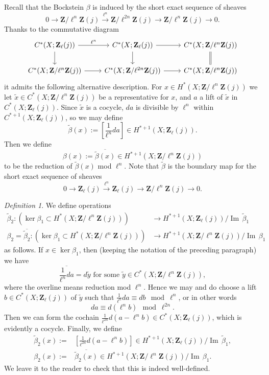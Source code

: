 \documentclass[10pt, reqno]{amsart}
\numberwithin{equation}{subsection}
\newcommand{\wt}[1]{\widetilde{#1}}
\newcommand{\Z}{\mathbf{Z}}
\newcommand{\ol}[1]{\overline{#1}}
\newcommand{\co}{\colon}
\DeclareMathOperator{\et}{\acute{e}t}
\DeclareMathOperator{\Ima}{Im\,}
\theoremstyle{remark}
\newtheorem{defn}[thm]{Definition}
\begin{document}
Recall that the Bockstein $\beta$ is induced by the short exact sequence of sheaves
\[
0 \rightarrow \Z/\ell^n \Z (j) \xrightarrow{\ell^n}	 \Z/\ell^{2n} \Z(j)  \rightarrow \Z/\ell^n \Z(j) \rightarrow 0.
\]
Thanks to the commutative diagram 
\[
\begin{tikzcd}
C^*(X; \Z_\ell(j)) \ar[d] \ar[r, "\ell^n"] & C^*(X; \Z_\ell(j)) \ar[r] \ar[d] & C^*(X; \Z/\ell^n\Z(j)) \ar[d, equals] \\
C^*(X; \Z/\ell^n\Z(j)) \ar[r] &  C^*(X; \Z/\ell^{2n}\Z(j)) \ar[r] &  C^*(X; \Z/\ell^n\Z(j))
\end{tikzcd}
\] 
it admits the following alternative description. For $x \in H^*_{\et}(X; \Z/\ell^n\Z(j))$ we let $\wt{x} \in C^*_{\et}(X; \Z/\ell^n \Z(j))$ be a representative for $x$, and $a$ a lift of $\wt{x}$ in $C^*_{\et}(X; \Z_{\ell}(j))$. Since $\wt{x}$ is a cocycle, $da$ is divisible by $\ell^n$ within $C^{*+1}_{\et}(X; \Z_{\ell}(j))$, so we may define 
\[
\wt{\beta}(x) := \left[\frac{1}{\ell^n}da \right]\in  H^{*+1}_{\et}(X; \Z_{\ell}(j)).
\]
Then we define 
\[
\beta(x) := \ol{\wt{\beta}(x) }\in H^{*+1}_{\et}(X; \Z/{\ell}^n \Z(j))
\]
to be the reduction of $\wt{\beta}(x)$ mod $\ell^n$. Note that $\wt{\beta}$ is the boundary map for the short exact sequence of sheaves
\[
0 \rightarrow \Z_\ell(j) \xrightarrow{\ell^n}	 \Z_{\ell}(j)  \rightarrow \Z/\ell^n \Z(j) \rightarrow 0.
\]

\begin{defn}\label{defn: beta_2}
We define operations
\begin{align*}
\wt{\beta}_2 \co (\ker \beta_1 \subset H^{*}_{\et}(X; \Z/\ell^n \Z(j)) ) & \rightarrow H^{*+1}_{\et}(X; \Z_{\ell}(j)) / \Ima \wt{\beta}_1 \\
\beta_2  = \ol{\wt{\beta}_2} \co (\ker \beta_1 \subset H^{*}_{\et}(X; \Z/\ell^n \Z(j)) ) &\rightarrow H^{*+1}_{\et}(X; \Z/\ell^n\Z(j)) / \Ima \beta_1
\end{align*}
as follows. If $x \in \ker \beta_1$, then (keeping the notation of the preceding paragraph) we have 
\[
\ol{\frac{1}{\ell^n}da} = d \wt{y} \text{  for some  } \wt{y} \in C^{*}_{\et}(X; \Z/\ell^n \Z(j)),
\]
where the overline means reduction mod $\ell^n$. Hence we may and do choose a lift $b \in C^{*}_{\et}(X; \Z_{\ell} (j)) $ of $\wt{y}$ such that $\frac{1}{\ell^n} d a \equiv d b\mod{\ell^n}$, or in other words 
\[
d a \equiv d (\ell^n b) \mod{\ell^{2n}}.
\]
Then we can form the cochain $\frac{1}{\ell^{2n}} d (a-\ell^n b) \in C^{*}_{\et}(X; \Z_{\ell} (j)) $, which is evidently a cocycle. Finally, we define 
\begin{align*}
\wt{\beta}_2(x) := &\left[\frac{1}{\ell^{2n}} d (a-\ell^n b) \right] \in H^{*+1}_{\et}(X; \Z_{\ell}(j)) / \Ima \wt{\beta}_1, \\
\beta_2(x) := &\ol{\wt{\beta}_2(x) } \in H^{*+1}_{\et}(X; \Z/\ell^n\Z(j)) / \Ima \beta_1.
\end{align*}
We leave it to the reader to check that this is indeed well-defined.
\end{defn}
\end{document}
